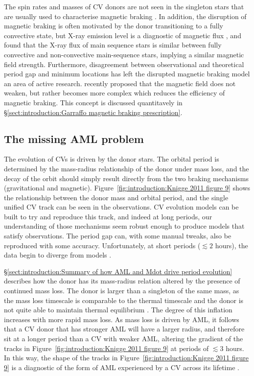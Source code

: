 The spin rates and masses of CV donors are not seen in the singleton stars that are usually used to characterise magnetic braking \citep{rappaport1983,matt2015,garraffo2018a}. 
In addition, the disruption of magnetic braking is often motivated by the donor transitioning to a fully convective state, but X-ray emission level is a diagnostic of magnetic flux \citep{pevtsov2003}, and \citet{wright2016} found that the X-ray flux of main sequence stars is similar between fully convective and non-convective main-sequence stars, implying a similar magnetic field strength. Furthermore, disagreement between observational and theoretical period gap and minimum locations \citep{knigge11} has left the disrupted magnetic braking model an area of active research. 
\citet{garraffo2018} recently proposed that the magnetic field does not weaken, but rather becomes more complex which reduces the efficiency of magnetic braking. This concept is discussed quantitavely in \S\ref{sect:introduction:Garraffo magnetic braking prescription}.


\subsection{The missing AML problem}

The evolution of CVs is driven by the donor stars. The orbital period is determined by the mass-radius relationship of the donor under mass loss, and the decay of the orbit should simply result directly from the two braking mechanisms (gravitational and magnetic). Figure~\ref{fig:introduction:Knigge 2011 figure 9} shows the relationship between the donor mass and orbital period, and the single unified CV track can be seen in the observations. CV evolution models can be built to try and reproduce this track, and indeed at long periods, our understanding of those mechanisms seem robust enough to produce models that satisfy observations. The period gap can, with some manual tweaks, also be reproduced with some accuracy. Unfortunately, at short periods ($\lesssim 2$ hours), the data begin to diverge from models \citep{knigge2006,knigge11}. 

\S\ref{sect:introduction:Summary of how AML and Mdot drive period evolution} describes how the donor has its mass-radius relation altered by the presence of continued mass loss. The donor is larger than a singleton of the same mass, as the mass loss timescale is comparable to the thermal timescale and the donor is not quite able to maintain thermal equilibrium \citep{knigge11}. The degree of this inflation increases with more rapid mass loss. As mass loss is driven by AML, it follows that a CV donor that has stronger AML will have a larger radius, and therefore sit at a longer period than a CV with weaker AML, altering the gradient of the tracks in Figure~\ref{fig:introduction:Knigge 2011 figure 9} at periods of $\lesssim 3$ hours. In this way, the shape of the tracks in Figure~\ref{fig:introduction:Knigge 2011 figure 9} is a diagnostic of the form of AML experienced by a CV across its lifetime \citep{knigge11}.

